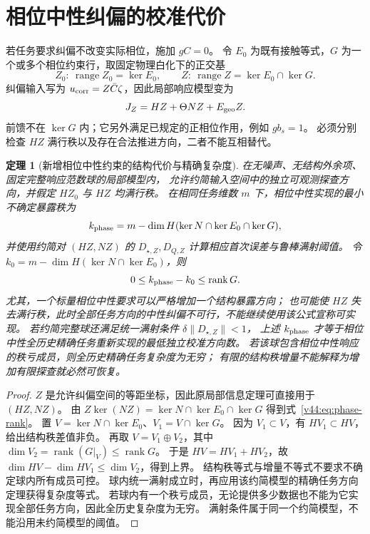 \documentclass[11pt,a4paper]{article}
\numberwithin{equation}{section}
\newtheorem{theorem}{定理}[section]
\theoremstyle{definition}
\begin{document}
\section{相位中性纠偏的校准代价}
\label{v44:sec:neutral-calibration}

若任务要求纠偏不改变实际相位，施加 $gC=0$。
令 $E_0$ 为既有接触等式，$G$ 为一个或多个相位约束行，取固定物理白化下的正交基
\begin{equation}
 Z_0:\ \operatorname{range}Z_0=\ker E_0,\qquad
 Z:\ \operatorname{range}Z=\ker E_0\cap\ker G.
 \label{v44:eq:phase-reduction}
\end{equation}
纠偏输入写为 $u_{\rm corr}=Z\bar C\zeta$，因此局部响应模型变为
\begin{equation}
 J_Z=HZ+\Theta NZ+E_{\rm geo}Z.
 \label{v44:eq:reduced-phase-model}
\end{equation}
前馈不在 $\ker G$ 内；它另外满足已规定的正相位作用，例如 $gb_s=1$。
必须分别检查 $HZ$ 满行秩以及存在合法推进方向，二者不能互相替代。

\begin{theorem}[新增相位中性约束的结构代价与精确复杂度]
\label{v44:thm:phase-rank-cost}
在无噪声、无结构外余项、固定完整响应范数球的局部模型内，
允许约简输入空间中的独立可观测探查方向，并假定 $HZ_0$ 与 $HZ$ 均满行秩。
在相同任务维数 $m$ 下，相位中性实现的最小不确定暴露秩为
\begin{equation}
 k_{\rm phase}=m-\dim H(\ker N\cap\ker E_0\cap\ker G),
 \label{v44:eq:phase-rank}
\end{equation}
并使用约简对 $(HZ,NZ)$ 的 $D_{\star,Z},D_{Q,Z}$ 计算相应首次误差与鲁棒满射阈值。
令 $k_0=m-\dim H(\ker N\cap\ker E_0)$，则
\begin{equation}
 0\le k_{\rm phase}-k_0\le\operatorname{rank}G.
 \label{v44:eq:phase-rank-increase}
\end{equation}
尤其，一个标量相位中性要求可以严格增加一个结构暴露方向；
也可能使 $HZ$ 失去满行秩，此时全部任务方向的中性纠偏不可行，不能继续使用该公式宣称可实现。
若约简完整球还满足统一满射条件 $\delta\|D_{\star,Z}\|<1$，
上述 $k_{\rm phase}$ 才等于相位中性全历史精确任务重新实现的最低独立校准方向数。
若该球包含相位中性响应的秩亏成员，则全历史精确任务复杂度为无穷；
有限的结构秩增量不能解释为增加有限探查就必然可恢复。
\end{theorem}
\begin{proof}
$Z$ 是允许纠偏空间的等距坐标，因此原局部信息定理可直接用于 $(HZ,NZ)$。
由 $Z\ker(NZ)=\ker N\cap\ker E_0\cap\ker G$ 得到式~\eqref{v44:eq:phase-rank}。
置 $V=\ker N\cap\ker E_0$、$V_1=V\cap\ker G$。
因为 $V_1\subset V$，有 $HV_1\subset HV$，给出结构秩差值非负。
再取 $V=V_1\oplus V_2$，其中
$\dim V_2=\operatorname{rank}(G|_V)\le\operatorname{rank}G$。
于是 $HV=HV_1+HV_2$，故
$\dim HV-\dim HV_1\le\dim V_2$，得到上界。
结构秩等式与增量不等式不要求不确定球内所有成员可控。
球内统一满射成立时，再应用该约简模型的精确任务方向定理获得复杂度等式。
若球内有一个秩亏成员，无论提供多少数据也不能为它实现全部任务方向，因此全历史复杂度为无穷。
满射条件属于同一个约简模型，不能沿用未约简模型的阈值。
\end{proof}
\end{document}
